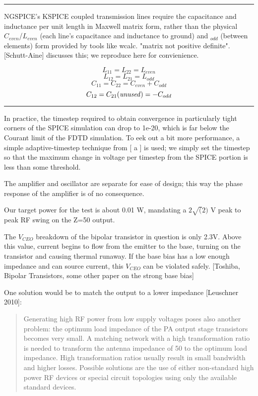 \documentclass[paper.tex]{subfiles}
\begin{document}
\rule{\linewidth}{0.2pt}

NGSPICE's KSPICE coupled transmission lines require the capacitance and inductance per unit length in Maxwell matrix form, rather than the physical $C_{even}$/$L_{even}$ (each line's capacitance and inductance to ground) and $_{odd}$ (between elements) form provided by tools like wcalc. "matrix not positive definite". [Schutt-Aine] discusses this; we reproduce here for convienience.

\[ L_{11} = L_{22} = L_{even}  \]
\[ L_{12} = L_{21} = L_{odd}  \]
\[ C_{11} = C_{22} = C_{even}+C_{odd}  \]
\[ C_{12} = C_{21} {\it{(unused)}} = -C_{odd}  \]

\rule{\linewidth}{0.2pt}

In practice, the timestep required to obtain convergence in particularly tight corners of the SPICE simulation can drop to 1e-20, which is far below the Courant limit of the FDTD simulation. To eek out a bit more performance, a simple adaptive-timestep technique from [ a ] is used; we simply set the timestep so that the maximum change in voltage per timestep from the SPICE portion is less than some threshold.



The amplifier and oscillator are separate for ease of design; this way the phase response of the amplifier is of no consequence. 

Our target power for the test is about 0.01 W, mandating a $2 \sqrt(2)$ V peak to peak RF swing on the Z=50 output.

The $V_{CEO}$ breakdown of the bipolar transistor in question is only 2.3V. Above this value, current begins to flow from the emitter to the base, turning on the transistor and causing thermal runaway. If the base bias has a low enough impedance and can source current, this $V_{CEO}$ can be violated safely. [Toshiba, Bipolar Transistors, some other paper on the strong base bias]

One solution would be to match the output to a lower impedance [Leuschner 2010]:

\begin{quote}
Generating high RF power from low supply voltages poses also another problem: the optimum load impedance of the PA output stage transistors becomes very small. A matching network with a high transformation ratio is needed to transform the antenna impedance of 50 to the optimum load impedance. High transformation ratios usually result in small bandwidth and higher losses. Possible solutions are the use of either non-standard high power RF devices or special circuit topologies using only the available standard devices.
\end{quote}
\end{document}
